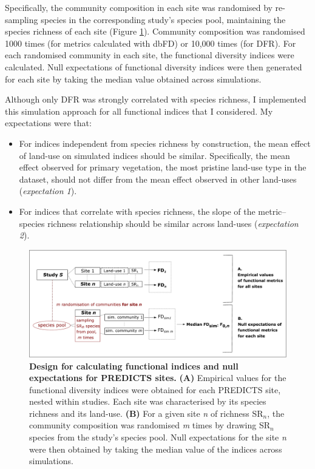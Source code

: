 Specifically, the community composition in each site was randomised by re-sampling species in the corresponding study's species pool, maintaining the species richness of each site (Figure \ref{FDcalc_chart}). Community composition was randomised 1000 times (for metrics calculated with dbFD) or 10,000 times (for DFR). For each randomised community in each site, the functional diversity indices were calculated. Null expectations of functional diversity indices were then generated for each site by taking the median value obtained across simulations.

Although only DFR was strongly correlated with species richness, I implemented this simulation approach for all functional indices that I considered. My expectations were that:
\begin{itemize}
\item For indices independent from species richness by construction, the mean effect of land-use on simulated indices should be similar. Specifically, the mean effect observed for primary vegetation, the most pristine land-use type in the dataset, should not differ from the mean effect observed in other land-uses (\textit{expectation 1}).
\item For indices that correlate with species richness, the slope of the metric--species richness relationship should be similar across land-uses (\textit{expectation 2}). 
\end{itemize} 


\begin{figure}[h!]
\centering
\includegraphics[scale=0.60]{figures/chapter3/chart_FD_calculations}
\caption[Design for calculating functional indices and null expectations for PREDICTS sites]{\textbf{Design for calculating functional indices and null expectations for PREDICTS sites.} \textbf{(A)} Empirical values for the functional diversity indices were obtained for each PREDICTS site, nested within studies. Each site was characterised by its species richness and its land-use. \textbf{(B)} For a given site \textit{n} of richness SR$_{n}$, the community composition was randomised \textit{m} times by drawing SR$_{n}$ species from the study's species pool. Null expectations for the site \textit{n} were then obtained by taking the median value of the indices across simulations.}
\label{FDcalc_chart}
\end{figure}

